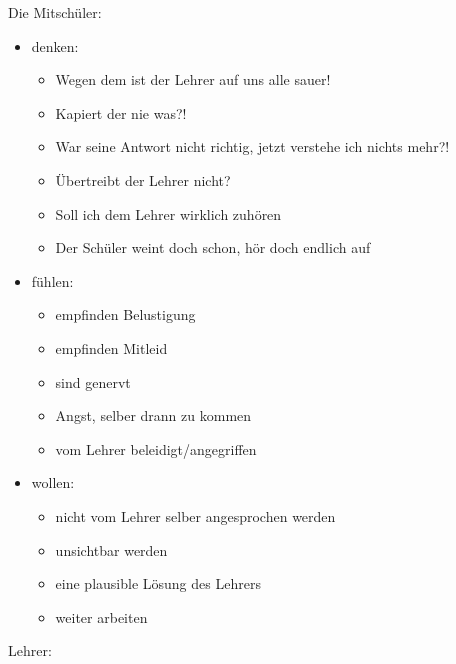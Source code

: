 \documentclass[12pt]{scrartcl}
\begin{document}
Die Mitschüler:
\begin{itemize}
  \item denken:
  \begin{itemize}
    \item Wegen dem ist der Lehrer auf uns alle sauer!
    \item Kapiert der nie was?!
    \item War seine Antwort nicht richtig, jetzt verstehe ich nichts mehr?!
    \item Übertreibt der Lehrer nicht?
    \item Soll ich dem Lehrer wirklich zuhören
    \item Der Schüler weint doch schon, hör doch endlich auf
  \end{itemize}
  \item fühlen:
  \begin{itemize}
    \item empfinden Belustigung
    \item empfinden Mitleid
    \item sind genervt
    \item Angst, selber drann zu kommen
    \item vom Lehrer beleidigt/angegriffen
  \end{itemize}
  \item wollen:
  \begin{itemize}
    \item nicht vom Lehrer selber angesprochen werden
    \item unsichtbar werden
    \item eine plausible Lösung des Lehrers
    \item weiter arbeiten
  \end{itemize}
\end{itemize}
Lehrer:
\end{document}
